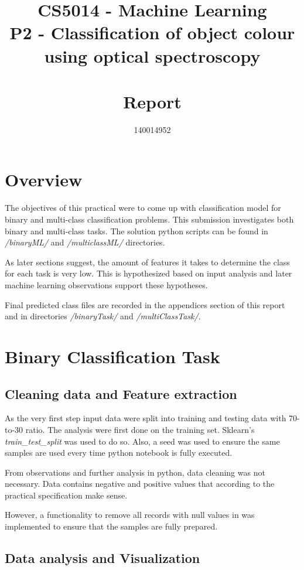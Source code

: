 \documentclass[11pt]{article}
\title{CS5014 - Machine Learning 
\\ \vspace{5mm} \Large P2 - Classification of object colour 
\\ using optical spectroscopy 
\\~\\ Report}
\author{140014952}
\begin{document}
	\maketitle

	\section{Overview}

		The objectives of this practical were to come up with classification model for binary and multi-class classification problems. This submission investigates both binary and multi-class tasks. The solution python scripts can be found in \textit{/binaryML/} and \textit{/multiclassML/} directories. 

		As later sections suggest, the amount of features it takes to determine the class for each task is very low. This is hypothesized based on input analysis and later machine learning observations support these hypotheses. 

		Final predicted class files are recorded in the appendices section of this report and in directories \textit{/binaryTask/} and \textit{/multiClassTask/}.

	\section{Binary Classification Task}

	\subsection{Cleaning data and Feature extraction}

		As the very first step input data were split into training and testing data with 70-to-30 ratio. The analysis were first done on the training set. Sklearn's \textit{train\_test\_split} was used to do so. Also, a seed was used to ensure the same samples are used every time python notebook is fully executed.

		From observations and further analysis in python, data cleaning was not necessary. Data contains negative and positive values that according to the practical specification make sense. 

		However, a functionality to remove all records with null values in was implemented to ensure that the samples are fully prepared.

	\subsection{Data analysis and Visualization}
\end{document}
